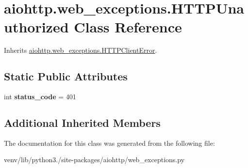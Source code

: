 \hypertarget{classaiohttp_1_1web__exceptions_1_1_h_t_t_p_unauthorized}{}\section{aiohttp.\+web\+\_\+exceptions.\+H\+T\+T\+P\+Unauthorized Class Reference}
\label{classaiohttp_1_1web__exceptions_1_1_h_t_t_p_unauthorized}


Inherits \hyperlink{classaiohttp_1_1web__exceptions_1_1_h_t_t_p_client_error}{aiohttp.\+web\+\_\+exceptions.\+H\+T\+T\+P\+Client\+Error}.

\subsection*{Static Public Attributes}
\begin{DoxyCompactItemize}
\item 
\mbox{\label{classaiohttp_1_1web__exceptions_1_1_h_t_t_p_unauthorized_a109befd2d56845732e88560581232f8e}} 
int {\bfseries status\+\_\+code} = 401
\end{DoxyCompactItemize}
\subsection*{Additional Inherited Members}


The documentation for this class was generated from the following file\+:\begin{DoxyCompactItemize}
\item 
venv/lib/python3./site-\/packages/aiohttp/web\+\_\+exceptions.\+py\end{DoxyCompactItemize}
